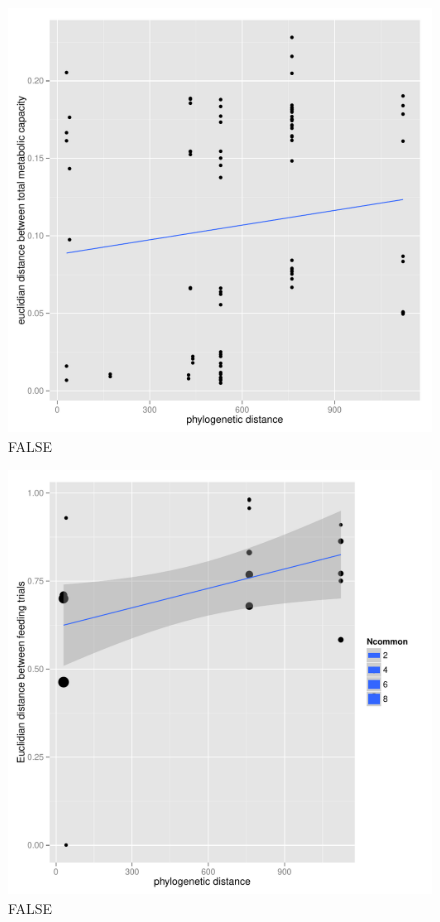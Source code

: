 \begin{figure}[htbp]
\centering
\includegraphics{figure/FIG_metabolic_occurance_as_phylo.pdf}
\caption{FALSE}
\end{figure}

\begin{figure}[htbp]
\centering
\includegraphics{figure/FIG_feeding_trial_as_phylo.pdf}
\caption{FALSE}
\end{figure}

